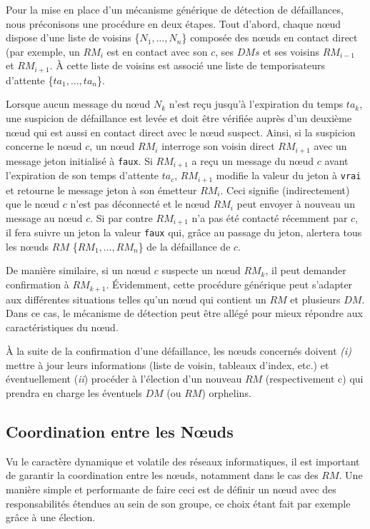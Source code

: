 Pour la mise en place d'un mécanisme générique de détection de défaillances, nous préconisons une procédure en deux étapes. 
Tout d'abord, chaque n{\oe}ud dispose d'une liste de voisins \{$N_1,…,N_n$\} composée des n{\oe}uds en contact direct (par exemple, un $RM_i$ est en contact avec son $c$, ses $DMs$ et ses voisins $RM_{i-1}$ et $RM_{i+1}$. À cette liste de voisins est associé une liste de temporisateurs d'attente \{$ta_1,…,ta_n$\}. 

Lorsque aucun message du n{\oe}ud $N_k$ n'est reçu jusqu'à l'expiration du temps $ta_k$, une suspicion de défaillance est levée et doit être vérifiée auprès d'un deuxième n{\oe}ud qui est aussi en contact direct avec le n{\oe}ud suspect. Ainsi, si la suspicion concerne le n{\oe}ud $c$, un n{\oe}ud $RM_i$ interroge son voisin direct $RM_{i+1}$ avec un message jeton initialisé à \texttt{faux}. Si $RM_{i+1}$ a reçu un message du n{\oe}ud $c$ avant l'expiration de son temps d'attente $ta_c$, $RM_{i+1}$ modifie la valeur du jeton à \texttt{vrai} et retourne le message jeton à son émetteur $RM_i$. Ceci signifie (indirectement) que le n{\oe}ud $c$ n'est pas déconnecté et le n{\oe}ud $RM_i$ peut envoyer à nouveau un message au n{\oe}ud $c$. Si par contre $RM_{i+1}$ n'a pas été contacté récemment par $c$, il fera suivre un jeton la valeur \texttt{faux} qui, grâce au passage du jeton, alertera tous les n{\oe}uds $RM$ \{$RM_1,…,RM_n$\} de la défaillance de $c$.

De manière similaire, si un n{\oe}ud $c$ suspecte un n{\oe}ud $RM_k$, il peut demander confirmation à $RM_{k+1}$. Évidemment, cette procédure générique peut s'adapter aux différentes situations telles qu'un n{\oe}ud qui contient un $RM$ et plusieurs $DM$. Dans ce cas, le mécanisme de détection peut être allégé pour mieux répondre aux caractéristiques du n{\oe}ud. 

À la suite de la confirmation d'une défaillance, les n{\oe}uds concernés doivent \textit{(i)} mettre à jour leurs informations (liste de voisin, tableaux d'index, etc.) et éventuellement (\textit{ii}) procéder à l'élection d'un nouveau $RM$ (respectivement c) qui prendra en charge les éventuels $DM$ (ou $RM$) orphelins.  

\subsection{Coordination entre les N{\oe}uds}

Vu le caractère dynamique et volatile des réseaux informatiques, il est important de garantir la coordination entre les n{\oe}uds, notamment dans le cas des $RM$. Une manière simple et performante de faire ceci est de définir un n{\oe}ud avec des responsabilités étendues au sein de son groupe, ce choix étant fait par exemple grâce à une élection. 

